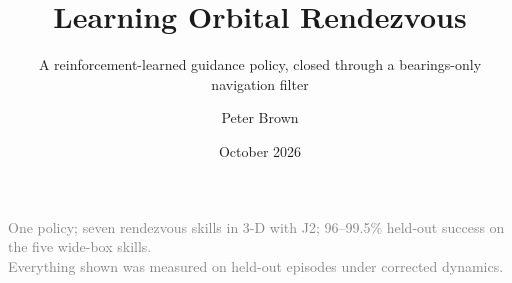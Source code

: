 \documentclass[aspectratio=169,11pt]{beamer}
\title{Learning Orbital Rendezvous}
\subtitle{A reinforcement-learned guidance policy, closed through a bearings-only navigation filter}
\author{Peter Brown}
\date{October 2026}
\begin{document}
\begin{frame}[plain]
  \titlepage
  \begin{center}\small\textcolor{grey}{
  One policy; seven rendezvous skills in 3-D with J2; 96--99.5\% held-out success on the five wide-box skills.\\
  Everything shown was measured on held-out episodes under corrected dynamics.}
  \end{center}
\end{frame}

\end{document}
